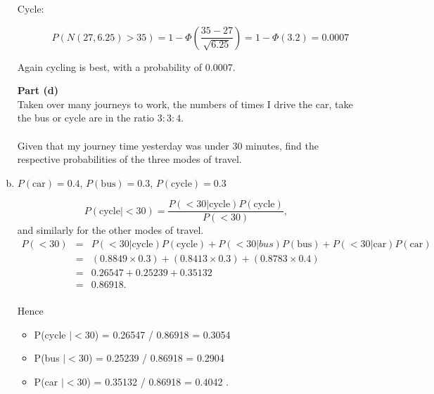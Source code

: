 \documentclass[a4paper,12pt]{article}
\begin{document}
\begin{enumerate}[(a)]
\begin{description}
			\item[Cycle: ]
			\[P (N(27,6.25) >35)  = 1- \Phi \left( \frac{35- 27}{\sqrt{6.25}} \right)  = 1- \Phi(3.2) = 0.0007\]
			
			
		\end{description}
		Again cycling is best, with a probability of 0.0007.
		

		\newpage
		
		\begin{framed}
			\noindent \textbf{Part (d)}\\ \large 
			\noindent \large Taken over many journeys to work, the numbers of times I drive the car, take the bus
			or cycle are in the ratio $3 : 3 : 4$. \\\\ \large Given that my journey time yesterday
			was under 30 minutes, find the respective probabilities of the three modes of
			travel.
			
		\end{framed}
		\item  $P(\mbox{car}) = 0.4$,  $P(\mbox{bus}) = 0.3$, $P(\mbox{cycle}) = 0.3$
		
		\[ P (\mbox{cycle}| <30)  = \frac{P (<30 | \mbox{cycle} ) P(\mbox{cycle}) }{P ( <30 )},\]
		and similarly for the other modes of travel.
		\begin{eqnarray*}
			P( < 30) &=& P(< 30| \mbox{cycle})P( \mbox{cycle}) + P(< 30| bus)P( \mbox{bus}) + P(< 30| \mbox{car} )P(\mbox{car})\\
			&=& (0.8849\times 0.3) + (0.8413\times 0.3) + (0.8783\times 0.4)\\
			&=& 0.26547 + 0.25239 + 0.35132 \\ 
			&=& 0.86918.\\
		\end{eqnarray*}
		
		Hence 
		\begin{itemize}
			\item P(cycle $| < 30$) = 0.26547 / 0.86918 = 0.3054
			\item P(bus $| < 30$) = 0.25239 / 0.86918 = 0.2904
			\item P(car $| < 30$) = 0.35132 / 0.86918 = 0.4042 .
		\end{itemize}
	\end{enumerate}
\end{document}
